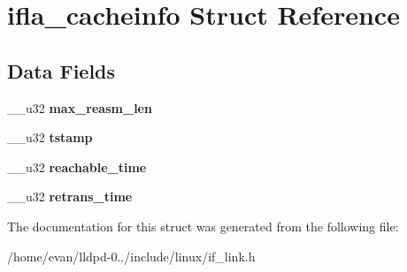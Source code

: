 \section{ifla\-\_\-cacheinfo \-Struct \-Reference}
\label{structifla__cacheinfo}
\subsection*{\-Data \-Fields}
\begin{DoxyCompactItemize}
\item 
\-\_\-\-\_\-u32 {\bfseries max\-\_\-reasm\-\_\-len}\label{structifla__cacheinfo_a0bdd13d7afa6f2bb9b863a1a0ef5746d}

\item 
\-\_\-\-\_\-u32 {\bfseries tstamp}\label{structifla__cacheinfo_a34a619193464150c4c4c026ccbd4b359}

\item 
\-\_\-\-\_\-u32 {\bfseries reachable\-\_\-time}\label{structifla__cacheinfo_a436677ade80869705819c922db84ef41}

\item 
\-\_\-\-\_\-u32 {\bfseries retrans\-\_\-time}\label{structifla__cacheinfo_a0dfdad7eb48bf7b994e5433f0a68a7ef}

\end{DoxyCompactItemize}


\-The documentation for this struct was generated from the following file\-:\begin{DoxyCompactItemize}
\item 
/home/evan/lldpd-\/0../include/linux/if\-\_\-link.\-h\end{DoxyCompactItemize}

